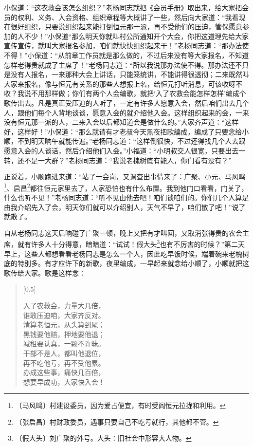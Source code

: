 \documentclass[12pt,UTF-8,openany]{ctexbook}
\begin{document}
\begin{large}
    小保道：“这农救会该怎么组织？”老杨同志就把《会员手册》取出来，给大家把会员的权利、义务、入会资格、组织章程等大概讲了一些，然后向大家道：“我看现在很好组织，只要说组织起来能打倒恒元那一派，再不受他们的压迫，管保愿意参加的人不少！”小保道“那么明天你就叫村公所通知开个大会，你把这道理先给大家宣传宣传，就叫大家报名参加，咱们就快快组织起来干！”老杨同志道：“那办法使不得！”小保道：“从前章工作员就是那么做的，不过后来没有等大家报名，不知道怎样老得贵就成了主席了！”老杨同志道：“所以我说那办法使不得。那办法还不只是没有人报名，一来那种大会上讲话，只能笼统讲，不能讲得很透彻；二来既然叫大家来报名，像与恒元有关系的那些人想报上名，给恒元打听消息，可该收呀不收？我说不用那样做；你们有两个人会编歌，就把‘入了农救会能怎样怎样’编成个歌传出去。凡是真正受压迫的人听了，一定有许多人愿意入会，然后咱们出去几个人，跟他们每个人背地谈谈，愿意入会的就介绍他入会。这样组织起来的会，一来没有恒元那一派的人，二来入会以后都知道会是做什么的。”大家齐声道：“这样好，这样好！”小保道：“那么就请有才老叔今天黑夜把歌编成，编成了只要念给小顺，不到明天晌午就能传遍。”老杨同志道：“这样倒很快，不过还得找几个人去跟愿意入会的人谈话，然后介绍他们入会。”小福道：“小明叔交人很宽，只要出去一转，还不是一大群？”老杨同志道：“我说老槐树底有能人，你们看有没有？”
    
    正说着，小顺跑进来道：“站了一会岗，又调查出事情来了：广聚、小元、马风鸣\footnote{〔马风鸣〕村建设委员，因为爱占便宜，有时受阎恒元拉拢和利用。}、启昌\footnote{〔张启昌〕村财政委员，遇事只要自己不吃亏就行，其他都不管。}都往恒元家里去了，人家恐怕也有什么布置。我到他门口看看，门关了，什么也听不见！”老杨同志道：“听不见由他去吧！咱们谈咱们的。你们几个人算是由我介绍先入了会，明天你们就可以介绍别人，天气不早了，咱们散了吧！”说了就散了。
    
    自从老杨同志这天后晌碰了广聚一顿，晚上又把有才叫回，又取消张得贵的农会主席，就有许多人十分得意，暗暗道：“试试！假大头\footnote{〔假大头〕刘广聚的外号。大头：旧社会中形容大人物。}也有不厉害的时候？”第二天早上，这些人都想看看老杨同志是怎么一个人，因此吃早饭时候，端着碗来老槐树底的特别多。有才应许下的新歌，夜里编成，一早起来就念给小顺了，小顺就把这歌传给大家。歌是这样念：
    
    \begin{verse}[0.5\linewidth]
    
    入了农救会，力量大几倍，\\谁敢压迫咱，大家齐反对。\\清算老恒元，从头算到尾；\\黑钱要他赔，押地要他退；\\减租要认真，一颗不许昧。\\干部不是人，都叫他退位，\\再不吃他亏，再不受他累。\\办成这些事，痛快几百倍，\\想要早成功，大家快入会！
    

\end{verse}
\end{large}
\end{document}
